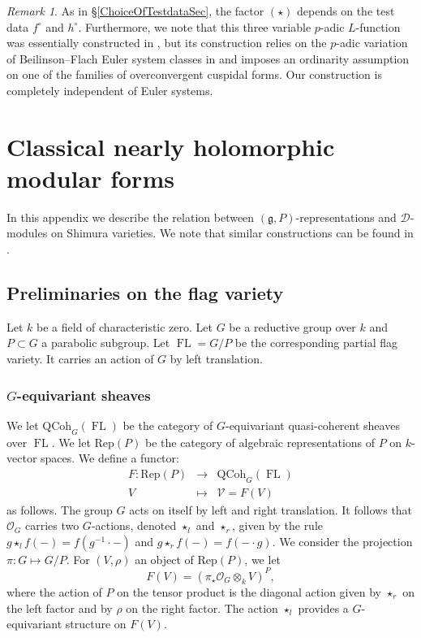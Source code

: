 \documentclass[10pt, oneside]{amsart}
\numberwithin{equation}{subsection}
\theoremstyle{definition}
\theoremstyle{remark}
\newtheorem{remark}[equation]{Remark}
\newcommand{\opn}[1]{\operatorname{#1}}
\begin{document}
\begin{remark} 
As in \S \ref{ChoiceOfTestdataSec}, the factor $(\star)$ depends on the test data $f^{\circ}$ and $h^{\circ}$. Furthermore, we note that this three variable $p$-adic $L$-function was essentially constructed in \cite{LoefflerRSNote}, but its construction relies on the $p$-adic variation of Beilinson--Flach Euler system classes in \cite{LZ16Coleman} and imposes an ordinarity assumption on one of the families of overconvergent cuspidal forms. Our construction is completely independent of Euler systems.
\end{remark}

\appendix

\section{Classical nearly holomorphic modular forms} \label{AppendixClassicalNHMFs}

In this appendix we describe the relation between $(\mathfrak{g}, P)$-representations and $\mathcal{D}$-modules on Shimura varieties. We note that similar constructions can be found in \cite{ZLiu19}.

\subsection{Preliminaries on the flag variety} \label{PrelimsOnFLAppendix}

Let $k$ be a field of characteristic zero. Let $G$ be a reductive group over $k$ and $P \subset G$ a parabolic subgroup. Let $\opn{FL} = G/P$ be the corresponding partial flag variety. It carries an action of $G$ by left translation. 

\subsubsection{\texorpdfstring{$G$}{G}-equivariant sheaves}

We let $\mathrm{QCoh}_{G}(\opn{FL})$ be the category of $G$-equivariant quasi-coherent sheaves over $\opn{FL}$. We let $\mathrm{Rep}(P)$ be the category of algebraic representations of $P$ on $k$-vector spaces. We define a functor:
\begin{eqnarray*}
F :  \mathrm{Rep}(P)  & \rightarrow & \mathrm{QCoh}_{G}(\opn{FL})\\
V & \mapsto & \mathcal{V}=F(V)
\end{eqnarray*}
as follows. The group $G$ acts on itself by left and right translation. It follows that $\mathcal{O}_G$ carries two $G$-actions, denoted $\star_l$ and $\star_r$, given by the rule $g \star_l f(-) = f(g^{-1} \cdot -)$ and $g \star_r f(-) = f(- \cdot g)$. We consider the projection $\pi : G \mapsto G/P$.  For $(V, \rho)$ an object of $\mathrm{Rep}(P)$, we let
\[ F(V) = (\pi_\star \mathcal{O}_{G} \otimes_k V)^P, \] where the action of $P$ on the tensor product is the diagonal action given by $\star_r$ on the left factor and by $\rho$ on the right factor. The action $\star_l$ provides a $G$-equivariant structure on $F(V)$. 
\end{document}
